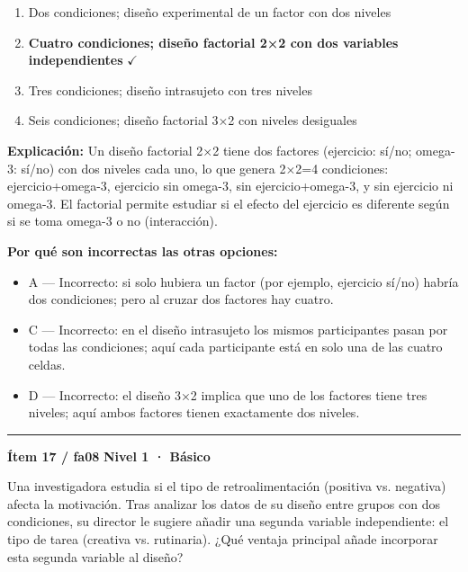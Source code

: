 \documentclass[12pt,a4paper]{article}
\begin{document}
\begin{enumerate}
  \item[A.] Dos condiciones; diseño experimental de un factor con dos niveles
  \item[\textbf{\color{verde}B.}] \textbf{\color{verde} Cuatro condiciones; diseño factorial 2×2 con dos variables independientes} \hfill $\checkmark$
  \item[C.] Tres condiciones; diseño intrasujeto con tres niveles
  \item[D.] Seis condiciones; diseño factorial 3×2 con niveles desiguales
\end{enumerate}

\noindent\textbf{\color{azul}Explicación:} Un diseño factorial 2×2 tiene dos factores (ejercicio: sí/no; omega-3: sí/no) con dos niveles cada uno, lo que genera 2×2=4 condiciones: ejercicio+omega-3, ejercicio sin omega-3, sin ejercicio+omega-3, y sin ejercicio ni omega-3. El factorial permite estudiar si el efecto del ejercicio es diferente según si se toma omega-3 o no (interacción).

\noindent\textbf{\color{gris}Por qué son incorrectas las otras opciones:}
\begin{itemize}
  \item {\small A — Incorrecto: si solo hubiera un factor (por ejemplo, ejercicio sí/no) habría dos condiciones; pero al cruzar dos factores hay cuatro.}
  \item {\small C — Incorrecto: en el diseño intrasujeto los mismos participantes pasan por todas las condiciones; aquí cada participante está en solo una de las cuatro celdas.}
  \item {\small D — Incorrecto: el diseño 3×2 implica que uno de los factores tiene tres niveles; aquí ambos factores tienen exactamente dos niveles.}
\end{itemize}
\vspace{8pt}\hrule\vspace{10pt}

\begin{mdframed}[backgroundcolor=fondogris,linecolor=azul,linewidth=1pt,innerleftmargin=10pt,innerrightmargin=10pt,innertopmargin=7pt,innerbottommargin=7pt]
\textbf{Ítem 17 / fa08} \hfill {\small\bfseries\color{azul} Nivel 1 · Básico}
\end{mdframed}

Una investigadora estudia si el tipo de retroalimentación (positiva vs. negativa) afecta la motivación. Tras analizar los datos de su diseño entre grupos con dos condiciones, su director le sugiere añadir una segunda variable independiente: el tipo de tarea (creativa vs. rutinaria). ¿Qué ventaja principal añade incorporar esta segunda variable al diseño?
\end{document}
